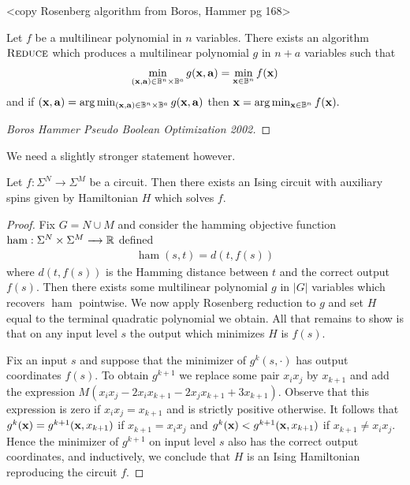 \documentclass{amsart}
\begin{document}
<copy Rosenberg algorithm from Boros, Hammer pg 168>

\begin{thm}\label{thm:rosenberg-reduction}
  Let $f$ be a multilinear polynomial in $n$ variables. There exists an algorithm $\textsc{Reduce}$ which produces a multilinear polynomial $g$ in $n + a$ variables such that
  \begin{align*}
    \min_{(\bfx, \bfa) \in \bB^n \times \bB^a} g(\bfx, \bfa) = \min_{\bfx \in \bB^n} f(\bfx)
  \end{align*}
  and if $(\bfx, \bfa) = \arg\min_{(\bfx, \bfa) \in \bB^n \times \bB^a} g(\bfx, \bfa)$ then $\bfx = \arg\min_{\bfx \in \bB^n} f(\bfx).$
\end{thm}
\begin{proof}
  [Boros Hammer Pseudo Boolean Optimization 2002]
\end{proof}
We need a slightly stronger statement however.
\begin{thm}
  Let $f:\Sigma^N \to \Sigma^M$ be a circuit. Then there exists an Ising circuit with auxiliary spins given by Hamiltonian $H$ which solves $f$.
\end{thm}
\begin{proof}
  Fix $G = N \cup M$ and consider the hamming objective function $\operatorname{ham}:\Sigma^N\times \Sigma^M\to \bR$ defined
  \begin{align*}
    \operatorname{ham}(s,t) = d(t, f(s))
  \end{align*}
  where $d(t, f(s))$ is the Hamming distance between $t$ and the correct output $f(s)$. Then there exists some multilinear polynomial $g$ in $|G|$ variables which recovers $\operatorname{ham}$ pointwise. We now apply Rosenberg reduction to $g$ and set $H$ equal to the terminal quadratic polynomial we obtain. All that remains to show is that on any input level $s$ the output which minimizes $H$ is $f(s)$.

  Fix an input $s$ and suppose that the minimizer of $g^k(s, \cdot)$ has output coordinates $f(s)$. To obtain $g^{k+1}$ we replace some pair $x_ix_j$ by $x_{k+1}$ and add the expression $M(x_ix_j - 2x_ix_{k+1} - 2x_jx_{k+1} + 3x_{k+1})$. Observe that this expression is zero if $x_ix_j = x_{k+1}$ and is strictly positive otherwise. It follows that $g^k(\mathbf{x}) = g^{k+1}(\mathbf{x}, x_{k+1})$ if $x_{k+1} = x_ix_j$ and $g^k(\mathbf{x}) < g^{k+1}(\mathbf{x}, x_{k+1})$ if $x_{k+1} \neq x_ix_j$. Hence the minimizer of $g^{k+1}$ on input level $s$ also has the correct output coordinates, and inductively, we conclude that $H$ is an Ising Hamiltonian reproducing the circuit $f$.
\end{proof}
\newpage


\end{document}
